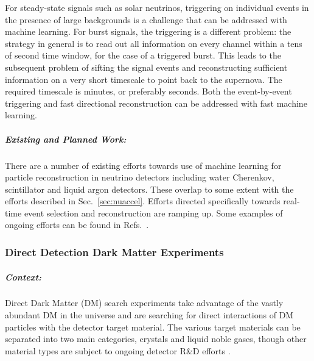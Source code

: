   For steady-state signals such as solar neutrinos, triggering on individual events in the presence of large backgrounds is a challenge that can be addressed with machine learning.  For burst signals, the triggering is a different problem: the strategy in general is to read out all information on every channel within a tens of second time window, for the case of a triggered burst.  This leads to the subsequent problem of sifting the signal events and reconstructing sufficient information on a very short timescale to point back to the supernova.  The required timescale is minutes, or preferably seconds.  Both the event-by-event triggering and fast directional reconstruction can be addressed with fast machine learning.


  
  
\subparagraph*{Existing and Planned Work:}

  There are a number of existing efforts towards use of machine learning for particle reconstruction in neutrino detectors including water Cherenkov, scintillator and liquid argon detectors. These overlap to some extent with the efforts described in Sec.~\ref{sec:nuaccel}.  Efforts directed specifically towards real-time event selection and reconstruction are ramping up.
  Some examples of ongoing efforts can be found in Refs.~\cite{Abi_2020,Drielsma:2021jdv,Qian:2021vnh,Acciarri:2020ond,Abratenko:2020pbp,Wang:2020fjr,Psihas_2020}.  

\subsubsection{Direct Detection Dark Matter Experiments}

\subparagraph*{Context:} Direct Dark Matter (DM) search experiments take advantage of the vastly abundant DM in the universe and are searching for direct interactions of DM particles with the detector target material. The various target materials can be separated into two main categories, crystals and liquid noble gases, though other material types are subject to ongoing detector R\&D efforts \cite{alexander2016dark, Schumann_2019}.

